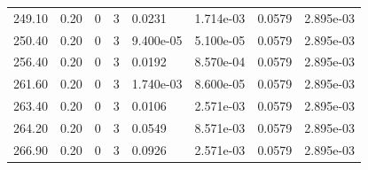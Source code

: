 \documentclass[preview]{standalone}
\begin{document}
{{{\begin{tabular}{L{1.2cm}C{1.2cm} C{0.3cm}C{0.5cm} C{1.4cm}C{1.4cm} C{1.4cm}C{1.4cm}}
  249.10  &  0.20  & 0     &  3 &  0.0231  & 1.714e-03  & 0.0579 &  2.895e-03   \\ 
  250.40  &  0.20  & 0     &  3 &  9.400e-05  & 5.100e-05  & 0.0579 &  2.895e-03   \\ 
  256.40  &  0.20  & 0     &  3 &  0.0192  & 8.570e-04  & 0.0579 &  2.895e-03   \\ 
  261.60  &  0.20  & 0     &  3 &  1.740e-03  & 8.600e-05  & 0.0579 &  2.895e-03   \\ 
  263.40  &  0.20  & 0     &  3 &  0.0106  & 2.571e-03  & 0.0579 &  2.895e-03   \\ 
  264.20  &  0.20  & 0     &  3 &  0.0549  & 8.571e-03  & 0.0579 &  2.895e-03   \\ 
  266.90  &  0.20  & 0     &  3 &  0.0926  & 2.571e-03  & 0.0579 &  2.895e-03   \\ 
\hline 
\end{tabular} 

}}}
\end{document}
